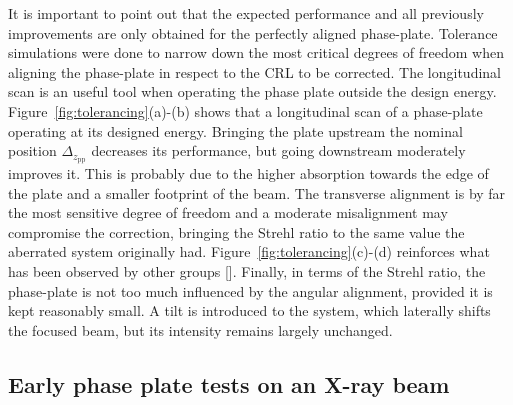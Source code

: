 \begin{refsection}
It is important to point out that the expected performance and all previously improvements are only obtained for the perfectly aligned phase-plate. Tolerance simulations were done to narrow down the most critical degrees of freedom when aligning the phase-plate in respect to the CRL to be corrected. The longitudinal scan is an useful tool when operating the phase plate outside the design energy. Figure~\ref{fig:tolerancing}(a)-(b) shows that a longitudinal scan of a phase-plate operating at its designed energy. Bringing the plate upstream the nominal position $\Delta_{z_\text{pp}}$ decreases its performance, but going downstream moderately improves it. This is probably due to the higher absorption towards the edge of the plate and a smaller footprint of the beam. The transverse alignment is by far the most sensitive degree of freedom and a moderate misalignment may compromise the correction, bringing the Strehl ratio to the same value the aberrated system originally had. Figure~\ref{fig:tolerancing}(c)-(d) reinforces what has been observed by other groups [\cite[Fig.~5.12]{Seiboth2016b}]. Finally, in terms of the Strehl ratio, the phase-plate is not too much influenced by the angular alignment, provided it is kept reasonably small. A tilt is introduced to the system, which laterally shifts the focused beam, but its intensity remains largely unchanged.

\subsection{Early phase plate tests on an X-ray beam}


\end{refsection}
